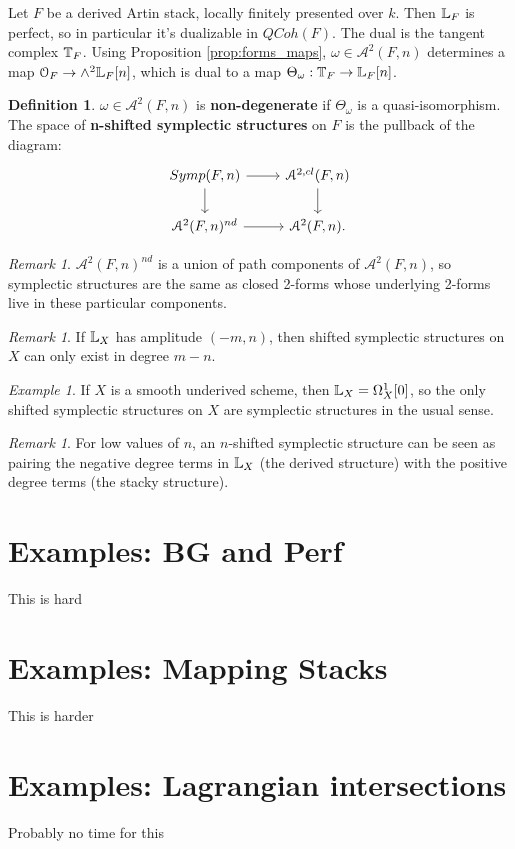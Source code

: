 \documentclass[10pt,a4paper,reqno,oneside]{book} %
\theoremstyle{plain}
\theoremstyle{definition}
\newtheorem{defin}[thm]{Definition}
\theoremstyle{remark}
\newtheorem{eg}[thm]{Example}
\newtheorem{rem}[thm]{Remark}
\numberwithin{equation}{section}
\begin{document}
Let $F$ be a derived Artin stack, locally finitely presented over $k$. Then $\mathbb L_F$ is perfect, so in particular it's
dualizable in $QCoh(F)$. The dual is the tangent complex $\mathbb T_F$.
Using Proposition \ref{prop:forms_maps}, $\omega \in \mathcal{A}^2(F,n)$ determines a map $\mathcal{O}_F \to
\wedge^2 \mathbb L_F[n]$, which is dual to a map $ \Theta_{\omega}: \mathbb T_F \to \mathbb L_F[n]$.

\begin{defin}
$\omega \in \mathcal{A}^2(F,n)$ is \textbf{non-degenerate} if $\Theta_{\omega}$ is a quasi-isomorphism. The space of
\textbf{n-shifted symplectic structures} on $F$ is the pullback of the diagram:
\[
\begin{tikzcd}
Symp(F,n)\arrow{d}\arrow{r} & \mathcal{A}^{2,cl}(F,n)\arrow{d} \\
\mathcal{A}^2(F,n)^{nd}\arrow{r} & \mathcal{A}^2(F,n).
\end{tikzcd}
\]
\end{defin}

\begin{rem}
$\mathcal{A}^2(F,n)^{nd}$ is a union of path components of $\mathcal{A}^2(F,n)$, so symplectic structures are the same as
closed 2-forms whose underlying 2-forms live in these particular components.
\end{rem}

\begin{rem}
If $\mathbb L_X$ has amplitude $(-m,n)$, then shifted symplectic structures on $X$ can only exist in degree $m-n$.
\end{rem}

\begin{eg}
If $X$ is a smooth underived scheme, then $\mathbb L_X = \Omega^1_X[0]$, so the only shifted symplectic structures on $X$
are symplectic structures in the usual sense.
\end{eg}

\begin{rem}
For low values of $n$, an $n$-shifted symplectic structure can be seen as pairing the negative degree terms in $\mathbb L_X$
(the derived structure) with the positive degree terms (the stacky structure).
\end{rem}


\section{Examples: BG and Perf}
This is hard

\section{Examples: Mapping Stacks}
This is harder

\section{Examples: Lagrangian intersections}
Probably no time for this





\end{document}
